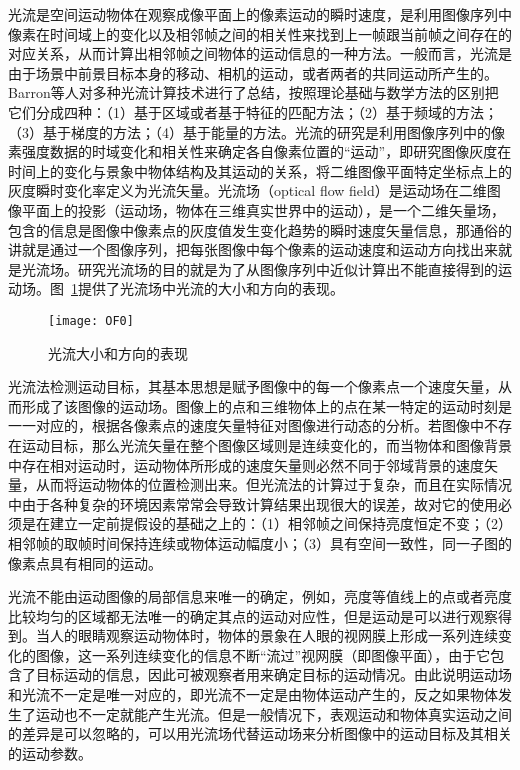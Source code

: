 光流是空间运动物体在观察成像平面上的像素运动的瞬时速度，是利用图像序列中像素在时间域上的变化以及相邻帧之间的相关性来找到上一帧跟当前帧之间存在的对应关系，从而计算出相邻帧之间物体的运动信息的一种方法。一般而言，光流是由于场景中前景目标本身的移动、相机的运动，或者两者的共同运动所产生的。Barron等人对多种光流计算技术进行了总结，按照理论基础与数学方法的区别把它们分成四种：（1）基于区域或者基于特征的匹配方法；（2）基于频域的方法；（3）基于梯度的方法；（4）基于能量的方法\citep{Barron1992}。光流的研究是利用图像序列中的像素强度数据的时域变化和相关性来确定各自像素位置的“运动”，即研究图像灰度在时间上的变化与景象中物体结构及其运动的关系，将二维图像平面特定坐标点上的灰度瞬时变化率定义为光流矢量。光流场（optical flow field）是运动场在二维图像平面上的投影（运动场，物体在三维真实世界中的运动），是一个二维矢量场，包含的信息是图像中像素点的灰度值发生变化趋势的瞬时速度矢量信息，那通俗的讲就是通过一个图像序列，把每张图像中每个像素的运动速度和运动方向找出来就是光流场。研究光流场的目的就是为了从图像序列中近似计算出不能直接得到的运动场。图~\ref{fig7}提供了光流场中光流的大小和方向的表现。

\begin{figure}[!htbp]
    \centering
    \texttt{[image: OF0]}
    \caption{光流大小和方向的表现}
    \label{fig7}
\end{figure}

光流法检测运动目标，其基本思想是赋予图像中的每一个像素点一个速度矢量，从而形成了该图像的运动场。图像上的点和三维物体上的点在某一特定的运动时刻是一一对应的，根据各像素点的速度矢量特征对图像进行动态的分析。若图像中不存在运动目标，那么光流矢量在整个图像区域则是连续变化的，而当物体和图像背景中存在相对运动时，运动物体所形成的速度矢量则必然不同于邻域背景的速度矢量，从而将运动物体的位置检测出来。但光流法的计算过于复杂，而且在实际情况中由于各种复杂的环境因素常常会导致计算结果出现很大的误差，故对它的使用必须是在建立一定前提假设的基础之上的：（1）相邻帧之间保持亮度恒定不变；（2）相邻帧的取帧时间保持连续或物体运动幅度小；（3）具有空间一致性，同一子图的像素点具有相同的运动。

光流不能由运动图像的局部信息来唯一的确定，例如，亮度等值线上的点或者亮度比较均匀的区域都无法唯一的确定其点的运动对应性，但是运动是可以进行观察得到。当人的眼睛观察运动物体时，物体的景象在人眼的视网膜上形成一系列连续变化的图像，这一系列连续变化的信息不断“流过”视网膜（即图像平面），由于它包含了目标运动的信息，因此可被观察者用来确定目标的运动情况。由此说明运动场和光流不一定是唯一对应的，即光流不一定是由物体运动产生的，反之如果物体发生了运动也不一定就能产生光流。但是一般情况下，表观运动和物体真实运动之间的差异是可以忽略的，可以用光流场代替运动场来分析图像中的运动目标及其相关的运动参数。


